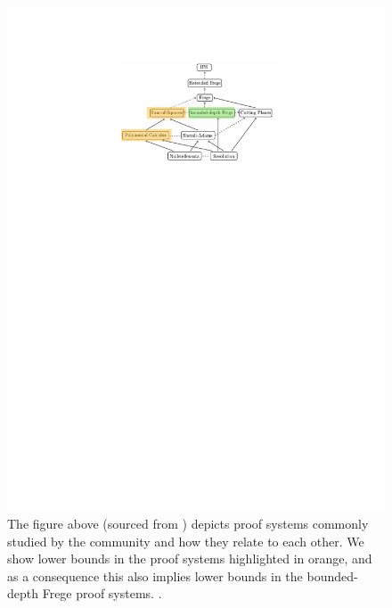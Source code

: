 \documentclass[11pt]{article}
\begin{document}
\begin{figure}
	\includegraphics{assets/proof-system-relationships.pdf}
	\caption{The figure above (sourced from \citep[Page 9]{fleming2019semialgebraic}) depicts proof systems commonly studied by the community and how they relate to each other. We show lower bounds in the proof systems highlighted in orange, and as a consequence this also implies lower bounds in the bounded-depth Frege proof systems. .}
	\label{fig:example-proof-systems}
\end{figure}
\end{document}
